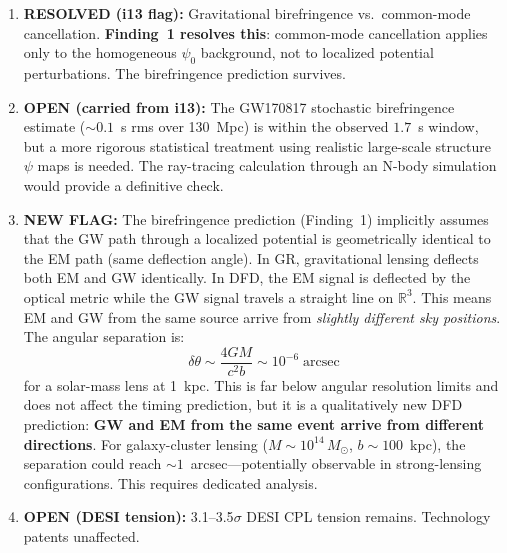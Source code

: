 \documentclass[11pt]{article}
\begin{document}
\begin{tcolorbox}[colback=red!5!white, colframe=red!60!black,
  title=\textbf{Inconsistency Flags --- W4i14}]

\begin{enumerate}
\item \textbf{RESOLVED (i13 flag):} Gravitational birefringence vs.\
  common-mode cancellation. \textbf{Finding~1 resolves this}: common-mode
  cancellation applies only to the homogeneous $\psi_0$ background, not
  to localized potential perturbations. The birefringence prediction
  survives.

\item \textbf{OPEN (carried from i13):} The GW170817 stochastic
  birefringence estimate ($\sim 0.1$~s rms over 130~Mpc) is within
  the observed $1.7$~s window, but a more rigorous statistical
  treatment using realistic large-scale structure $\psi$ maps is
  needed. The ray-tracing calculation through an N-body simulation
  would provide a definitive check.

\item \textbf{NEW FLAG:} The birefringence prediction (Finding~1)
  implicitly assumes that the GW path through a localized potential
  is geometrically identical to the EM path (same deflection angle).
  In GR, gravitational lensing deflects both EM and GW identically.
  In DFD, the EM signal is deflected by the optical metric while
  the GW signal travels a straight line on $\mathbb{R}^3$. This
  means EM and GW from the same source arrive from
  \emph{slightly different sky positions}. The angular separation is:
  \begin{equation}
  \delta\theta \sim \frac{4GM}{c^2 b} \sim 10^{-6}\;\text{arcsec}
  \end{equation}
  for a solar-mass lens at 1~kpc. This is far below angular
  resolution limits and does not affect the timing prediction, but
  it is a qualitatively new DFD prediction: \textbf{GW and EM from
  the same event arrive from different directions}. For galaxy-cluster
  lensing ($M \sim 10^{14}\,M_\odot$, $b \sim 100$~kpc), the
  separation could reach $\sim 1$~arcsec---potentially observable
  in strong-lensing configurations. This requires dedicated analysis.

\item \textbf{OPEN (DESI tension):} 3.1--3.5$\sigma$ DESI CPL
  tension remains. Technology patents unaffected.
\end{enumerate}
\end{tcolorbox}
\end{document}
